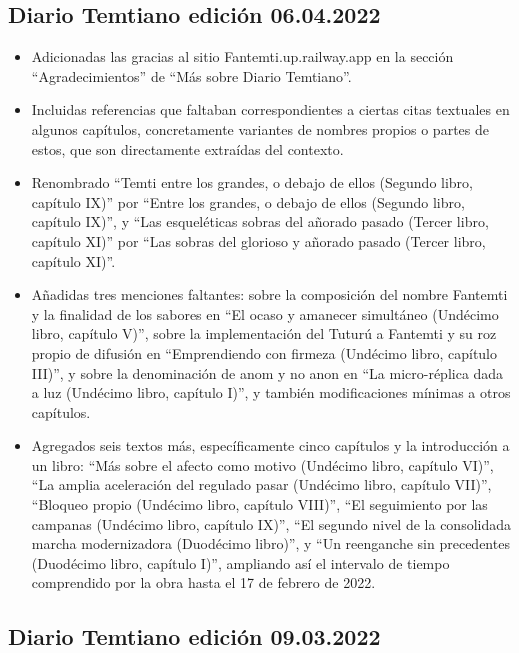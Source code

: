 \documentclass[
]{book}
\begin{document}
\hypertarget{diario-temtiano-ediciuxf3n-06.04.2022}{%
\subsection*{Diario Temtiano edición 06.04.2022}\label{diario-temtiano-ediciuxf3n-06.04.2022}}

\begin{itemize}
\item
  Adicionadas las gracias al sitio Fantemti.up.railway.app en la sección ``Agradecimientos'' de ``Más sobre Diario Temtiano''.
\item
  Incluidas referencias que faltaban correspondientes a ciertas citas textuales en algunos capítulos, concretamente variantes de nombres propios o partes de estos, que son directamente extraídas del contexto.
\item
  Renombrado ``Temti entre los grandes, o debajo de ellos (Segundo libro, capítulo IX)'' por ``Entre los grandes, o debajo de ellos (Segundo libro, capítulo IX)'', y ``Las esqueléticas sobras del añorado pasado (Tercer libro, capítulo XI)'' por ``Las sobras del glorioso y añorado pasado (Tercer libro, capítulo XI)''.
\item
  Añadidas tres menciones faltantes: sobre la composición del nombre Fantemti y la finalidad de los sabores en ``El ocaso y amanecer simultáneo (Undécimo libro, capítulo V)'', sobre la implementación del Tuturú a Fantemti y su roz propio de difusión en ``Emprendiendo con firmeza (Undécimo libro, capítulo III)'', y sobre la denominación de anom y no anon en ``La micro-réplica dada a luz (Undécimo libro, capítulo I)'', y también modificaciones mínimas a otros capítulos.
\item
  Agregados seis textos más, específicamente cinco capítulos y la introducción a un libro: ``Más sobre el afecto como motivo (Undécimo libro, capítulo VI)'', ``La amplia aceleración del regulado pasar (Undécimo libro, capítulo VII)'', ``Bloqueo propio (Undécimo libro, capítulo VIII)'', ``El seguimiento por las campanas (Undécimo libro, capítulo IX)'', ``El segundo nivel de la consolidada marcha modernizadora (Duodécimo libro)'', y ``Un reenganche sin precedentes (Duodécimo libro, capítulo I)'', ampliando así el intervalo de tiempo comprendido por la obra hasta el 17 de febrero de 2022.
\end{itemize}

\hypertarget{diario-temtiano-ediciuxf3n-09.03.2022}{%
\subsection*{Diario Temtiano edición 09.03.2022}\label{diario-temtiano-ediciuxf3n-09.03.2022}}
\end{document}
